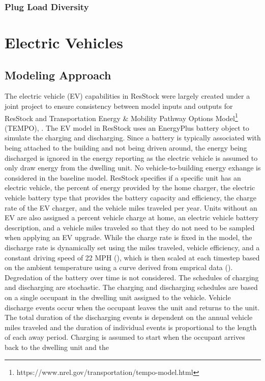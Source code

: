 \subsubsection{Plug Load Diversity}\label{plug_load_diversity}









\section{Electric Vehicles}

\subsection{Modeling Approach}
The electric vehicle (EV) capabilities in ResStock were largely created under a joint project to ensure consistency between model inputs and outputs for ResStock and Transportation Energy \& Mobility Pathway Options Model\footnote{https://www.nrel.gov/transportation/tempo-model.html} (TEMPO), \cite{MURATORI2021102967}. The EV model in ResStock uses an EnergyPlus battery object to simulate the charging and discharging. Since a battery is typically associated with being attached to the building and not being driven around, the energy being discharged is ignored in the energy reporting as the electric vehicle is assumed to only draw energy from the dwelling unit. No vehicle-to-building energy exhange is considered in the baseline model. ResStock specifies if a specific unit has an electric vehicle, the percent of energy provided by the home charger, the electric vehicle battery type that provides the battery capacity and efficiency, the charge rate of the EV charger, and the vehicle miles traveled per year. Units without an EV are also assigned a percent vehicle charge at home, an electric vehicle battery description, and a vehicle miles traveled so that they do not need to be sampled when applying an EV upgrade. While the charge rate is fixed in the model, the discharge rate is dynamically set using the miles traveled, vehicle efficiency, and a constant driving speed of 22 MPH (\cite{NHTS2017}), which is then scaled at each timestep based on the ambient temperature using a curve derived from emprical data (\cite{YIP2023}). Degredation of the battery over time is not considered. The schedules of charging and discharging are stochastic. The charging and discharging schedules are based on a single occupant in the dwelling unit assigned to the vehicle. Vehicle discharge events occur when the occupant leaves the unit and returns to the unit. The total duration of the discharging events is dependent on the annual vehicle miles traveled and the duration of individual events is proportional to the length of each away period. Charging is assumed to start when the occupant arrives back to the dwelling unit and the 